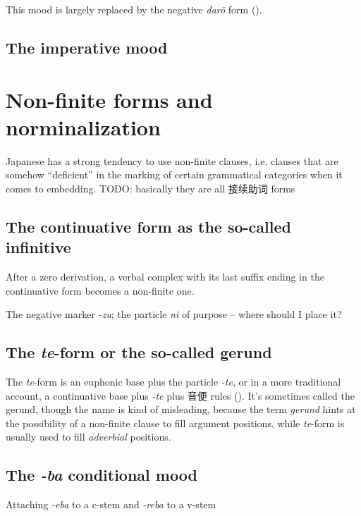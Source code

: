 \documentclass[UTF8, a4paper, oneside, scheme=plain]{ctexrep}
\newcommand*{\term}[1]{\emph{#1}}
\newcommand{\corpus}[1]{\emph{#1}}
\begin{document}
This mood is largely replaced by the negative \corpus{dar\={o}} form ().

\subsection{The imperative mood}\label{sec:imperative}

\section{Non-finite forms and norminalization}\label{sec:non-finite}

Japanese has a strong tendency to use non-finite clauses,
i.e. clauses that are somehow ``deficient'' in the marking of certain grammatical categories 
when it comes to embedding.
TODO: basically they are all 接续助词 forms

\subsection{The continuative form as the so-called infinitive}

After a zero derivation, 
a verbal complex with its last suffix ending in the continuative form 
becomes a non-finite one.

The negative marker \corpus{-zu}; the particle \corpus{ni} of purpose -- where should I place it?

\subsection{The \corpus{te}-form or the so-called gerund}\label{sec:te-form}

The \corpus{te}-form is an euphonic base plus the particle \corpus{-te},
or in a more traditional account,
a continuative base plus \corpus{-te} plus 音便 rules ().
It's sometimes called the gerund,
though the name is kind of misleading,
because the term \term{gerund} hints at the possibility of a non-finite clause to fill argument positions,
while \corpus{te}-form is usually used to fill \emph{adverbial} positions.

\subsection{The \corpus{-ba} conditional mood} \label{sec:eba-form}

Attaching \corpus{-eba} to a c-stem and \corpus{-reba} to a v-stem 
\end{document}
